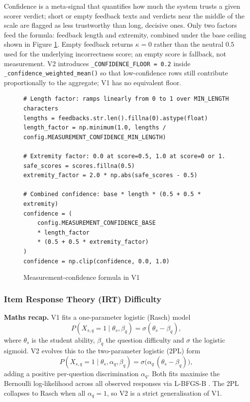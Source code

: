 Confidence is a meta-signal that quantifies how much the system trusts a given scorer verdict; short or empty feedback texts and verdicts near the middle of the scale are flagged as less trustworthy than long, decisive ones.
Only two factors feed the formula: feedback length and extremity, combined under the base ceiling shown in Figure \ref{fig:code-confidence}.
Empty feedback returns $\kappa = 0$ rather than the neutral $0.5$ used for the underlying incorrectness score; an empty score is fallback, not measurement.
V2 introduces \texttt{\_CONFIDENCE\_FLOOR = 0.2} inside \texttt{\_confidence\_weighted\_mean()} so that low-confidence rows still contribute proportionally to the aggregate; V1 has no equivalent floor.


\begin{figure}[H]
    \centering
    \begin{minipage}{0.92\linewidth}
\begin{lstlisting}[firstnumber=31]
# Length factor: ramps linearly from 0 to 1 over MIN_LENGTH characters
lengths = feedbacks.str.len().fillna(0).astype(float)
length_factor = np.minimum(1.0, lengths / config.MEASUREMENT_CONFIDENCE_MIN_LENGTH)

# Extremity factor: 0.0 at score=0.5, 1.0 at score=0 or 1.
safe_scores = scores.fillna(0.5)
extremity_factor = 2.0 * np.abs(safe_scores - 0.5)

# Combined confidence: base * length * (0.5 + 0.5 * extremity)
confidence = (
    config.MEASUREMENT_CONFIDENCE_BASE
    * length_factor
    * (0.5 + 0.5 * extremity_factor)
)
confidence = np.clip(confidence, 0.0, 1.0)
\end{lstlisting}
    \end{minipage}
    \caption{Measurement-confidence formula in V1}
    \label{fig:code-confidence}
\end{figure} 

\subsubsection{Item Response Theory (IRT) Difficulty}

\textbf{Maths recap.}
V1 fits a one-parameter logistic (Rasch) model
\[
P(X_{s,q} = 1 \mid \theta_s, \beta_q) = \sigma(\theta_s - \beta_q),
\]
where $\theta_s$ is the student ability, $\beta_q$ the question difficulty and $\sigma$ the logistic sigmoid.
V2 evolves this to the two-parameter logistic (2PL) form
\[
P(X_{s,q} = 1 \mid \theta_s, \alpha_q, \beta_q) = \sigma\!\big(\alpha_q\,(\theta_s - \beta_q)\big),
\]
adding a positive per-question discrimination $\alpha_q$.
Both fits maximise the Bernoulli log-likelihood across all observed responses via L-BFGS-B \cite{byrdLimitedMemoryAlgorithm1995}.
The 2PL collapses to Rasch when all $\alpha_q = 1$, so V2 is a strict generalisation of V1. 

